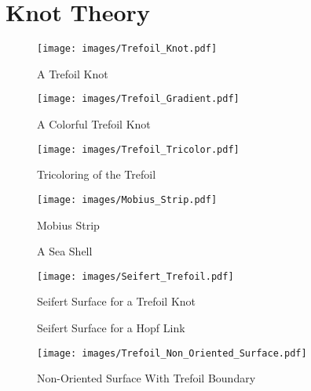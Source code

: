 \chapter{Knot Theory}
    \begin{figure}[H]
        \centering
        \texttt{[image: images/Trefoil\_Knot.pdf]}
        \caption{A Trefoil Knot}
        \label{fig:Trefoil_Knot}
    \end{figure}
    \begin{figure}[H]
        \centering
        \texttt{[image: images/Trefoil\_Gradient.pdf]}
        \caption{A Colorful Trefoil Knot}
        \label{fig:Colorful_Trefoil_Knot}
    \end{figure}
    \begin{figure}[H]
        \centering
        \texttt{[image: images/Trefoil\_Tricolor.pdf]}
        \caption{Tricoloring of the Trefoil}
        \label{fig:Trefoil_Tricoloring}
    \end{figure}
    \begin{figure}[H]
        \centering
        \texttt{[image: images/Mobius\_Strip.pdf]}
        \caption{Mobius Strip}
        \label{fig:Mobius_Strip}
    \end{figure}
    \begin{figure}[H]
        \centering
        \caption{A Sea Shell}
        \label{fig:Sea_Shell}
    \end{figure}
    \begin{figure}[H]
        \centering
        \texttt{[image: images/Seifert\_Trefoil.pdf]}
        \caption{Seifert Surface for a Trefoil Knot}
        \label{fig:Seifert_Surface_Trefoil}
    \end{figure}
    \begin{figure}[H]
        \centering
        \caption{Seifert Surface for a Hopf Link}
        \label{fig:Seifert_Surface_Hopf_Link}
    \end{figure}
    \begin{figure}[H]
        \centering
        \texttt{[image: images/Trefoil\_Non\_Oriented\_Surface.pdf]}
        \caption{Non-Oriented Surface With Trefoil Boundary}
        \label{fig:Trefoil_Non_Oriented_Surface}
    \end{figure}